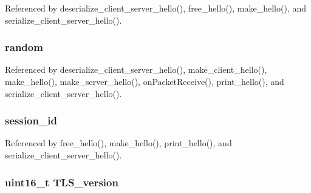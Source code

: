 Referenced by deserialize\+\_\+client\+\_\+server\+\_\+hello(), free\+\_\+hello(), make\+\_\+hello(), and serialize\+\_\+client\+\_\+server\+\_\+hello().

\subsubsection[{\texorpdfstring{random}{random}}]{ random}\hypertarget{structserver__client__hello__t_aefaae3d96978baaa21b9445a5728b4fe}{}\label{structserver__client__hello__t_aefaae3d96978baaa21b9445a5728b4fe}


Referenced by deserialize\+\_\+client\+\_\+server\+\_\+hello(), make\+\_\+client\+\_\+hello(), make\+\_\+hello(), make\+\_\+server\+\_\+hello(), on\+Packet\+Receive(), print\+\_\+hello(), and serialize\+\_\+client\+\_\+server\+\_\+hello().

\subsubsection[{\texorpdfstring{session\+\_\+id}{session_id}}]{ session\+\_\+id}\hypertarget{structserver__client__hello__t_a74379b0c9faddd3c3481e648a4ba2356}{}\label{structserver__client__hello__t_a74379b0c9faddd3c3481e648a4ba2356}


Referenced by free\+\_\+hello(), make\+\_\+hello(), print\+\_\+hello(), and serialize\+\_\+client\+\_\+server\+\_\+hello().

\subsubsection[{\texorpdfstring{T\+L\+S\+\_\+version}{TLS_version}}]{\setlength{\rightskip}{0pt plus 5cm}uint16\+\_\+t {\bf T\+L\+S\+\_\+version}}\hypertarget{structserver__client__hello__t_a5b4305b976c657bb4a056e00aeadb8ef}{}\label{structserver__client__hello__t_a5b4305b976c657bb4a056e00aeadb8ef}


